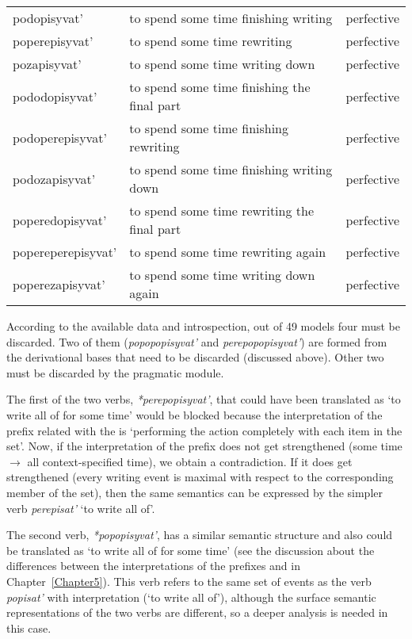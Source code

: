 \begin{longtable}{lll}
podopisyvat' & to spend some time finishing writing & perfective \\ 
poperepisyvat' & to spend some time rewriting & perfective \\ 
pozapisyvat' & to spend some time writing down & perfective \\ 
pododopisyvat' & to spend some time finishing the final part & perfective \\ 
podoperepisyvat' & to spend some time finishing rewriting & perfective \\ 
podozapisyvat' & to spend some time finishing writing down & perfective \\ 
poperedopisyvat' & to spend some time rewriting the final part & perfective \\ 
popereperepisyvat' & to spend some time rewriting again & perfective \\ 
poperezapisyvat' & to spend some time writing down again & perfective \\  
\end{longtable}

According to the available data and introspection, out of 49 models four must be discarded. Two of them (\textit{popopopisyvat'} and \textit{perepopopisyvat'}) are formed from the derivational bases that need to be discarded (discussed above). Other two must be discarded by the pragmatic module.

The first of the two verbs, \textit{*perepopisyvat'}, that could have been translated as `to write all of for some time' would be blocked because the interpretation of the prefix  related with the  is `performing the action completely with each item in the set'. Now, if the interpretation of the prefix  does not get strengthened (some time $\rightarrow$ all context-specified time), we obtain a contradiction.  If it does get strengthened (every writing event is maximal with respect to the corresponding member of the set), then the same semantics can be expressed by the simpler verb \textit{perepisat'} `to write all of'. 

The second verb, \textit{*popopisyvat'}, has a similar semantic structure and also could be translated as `to write all of for some time' (see the discussion about the differences between the  interpretations of the prefixes  and  in Chapter~\ref{Chapter5}). This verb refers to the same set of events as the verb \textit{popisat'} with  interpretation (`to write all of'), although the surface semantic representations of the two verbs are different, so a deeper analysis is needed in this case.

